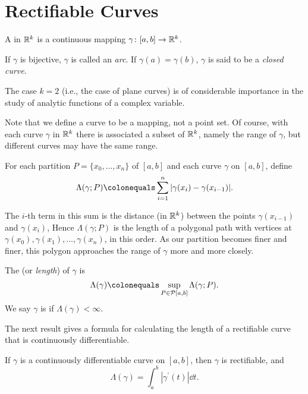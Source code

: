 \section{Rectifiable Curves}
\begin{definition}[Curve]
A  in $\mathbb R^k$ is a continuous mapping $\gamma\colon[a,b]\to\mathbb R^k$.

If $\gamma$ is bijective, $\gamma$ is called an \emph{arc}. If $\gamma(a)=\gamma(b)$, $\gamma$ is said to be a \emph{closed curve}.
\end{definition}

The case $k=2$ (i.e., the case of plane curves) is of considerable importance in the study of analytic functions of a complex variable.

\begin{remark}
Note that we define a curve to be a mapping, not a point set. Of course, with each curve $\gamma$ in $\mathbb R^k$ there is associated a subset of $\mathbb R^k$, namely the range of $\gamma$, but different curves may have the same range. 
\end{remark}

For each partition $P=\{x_0,\dots,x_n\}$ of $[a,b]$ and each curve $\gamma$ on $[a,b]$, define
\[\Lambda(\gamma;P)\colonequals\sum_{i=1}^{n}|\gamma(x_i)-\gamma(x_{i-1})|.\]

The $i$-th term in this sum is the distance (in $\mathbb R^k$) between the points $\gamma(x_{i-1})$ and $\gamma(x_i)$, Hence $\Lambda(\gamma;P)$ is the length of a polygonal path with vertices at $\gamma(x_0),\gamma(x_1),\dots,\gamma(x_n)$, in this order. As our partition becomes finer and finer, this polygon approaches the range of $\gamma$ more and more closely.


\begin{definition}
The  (or \emph{length}) of $\gamma$ is
\[\Lambda(\gamma)\colonequals\sup_{P\in\mathcal{P}[a,b]}\Lambda(\gamma;P).\]
We say $\gamma$ is  if $\Lambda(\gamma)<\infty$. 
\end{definition}

The next result gives a formula for calculating the length of a rectifiable curve that is continuously differentiable.

\begin{proposition}
If $\gamma$ is a continuously differentiable curve on $[a,b]$, then $\gamma$ is rectifiable, and
\begin{equation}
\Lambda(\gamma)=\int_{a}^{b}|\gamma^\prime(t)|\dd{t}.
\end{equation}
\end{proposition}

